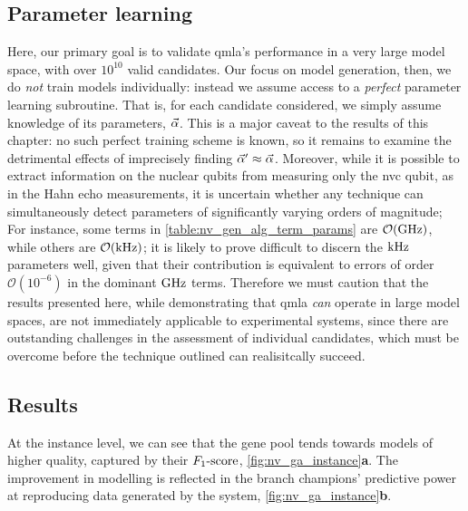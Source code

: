 \subsection{Parameter learning}
Here, our primary goal is to validate \gls{qmla}'s performance in a 
    very large \gls{model space}, with over $10^{10}$ valid candidates. 
Our focus on model generation, then, we do \emph{not} train models individually:
    instead we assume access to a \emph{perfect} parameter learning subroutine.
That is, for each candidate considered, we simply assume knowledge of its parameters, $\vec{\alpha}$. 
This is a major caveat to the results of this chapter: 
    no such perfect training scheme is known, 
    so it remains to examine the detrimental effects of imprecisely finding $\vec{\alpha}^{\prime} \approx \vec{\alpha}$. 
Moreover, while it is possible to extract information on the nuclear qubits from measuring only the 
    \gls{nvc} qubit, as in the Hahn echo measurements, 
    it is uncertain whether any technique can simultaneously detect parameters of significantly varying orders of magnitude;
For instance, some terms in \cref{table:nv_gen_alg_term_params} are $\mathcal{O}(\textrm{GHz})$, 
    while others are $\mathcal{O}(\textrm{kHz})$;
    it is likely to prove difficult to discern the $\textrm{kHz}$ parameters well, given that their contribution is equivalent 
    to errors of order $\mathcal{O}(10^{-6})$ in the dominant $\textrm{GHz}$ terms. 
Therefore we must caution that the results presented here, 
    while demonstrating that \gls{qmla} \emph{can} operate in large model spaces, 
    are not immediately applicable to experimental systems, 
    since there are outstanding challenges in the assessment of individual candidates, 
    which must be overcome before the technique outlined can realisitcally succeed. 


\subsection{Results}
At the instance level, we can see that the gene pool tends towards models of higher quality, 
    captured by their $ F_{1}\text{-score} $, \cref{fig:nv_ga_instance}\textbf{a}. 
The improvement in modelling is reflected in the branch champions' predictive power at 
    reproducing data generated by the system, \cref{fig:nv_ga_instance}\textbf{b}. 


